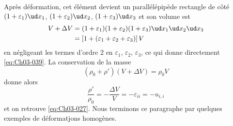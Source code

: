 Après déformation, cet élément devient un parallélépipède rectangle de côté $(1+\varepsilon_1)\ud x_1$, $(1+\varepsilon_2)\ud x_2$, $(1+\varepsilon_3)\ud x_3$ et son volume est
\begin{align*}
    V+\Delta V &= (1+\varepsilon_1)(1+\varepsilon_2)(1+\varepsilon_3)\ud x_1 \ud x_2 \ud x_3 \\
    &= \left[ 1 + \left( \varepsilon_1 + \varepsilon_2 + \varepsilon_3 \right) \right] V
\end{align*}
en négligeant les termes d'ordre 2 en $\varepsilon_1$, $\varepsilon_2$, $\varepsilon_3$, ce qui donne directement \eqref{eq:Ch03-039}.
La conservation de la masse
\begin{equation*}
    \left( \rho_0 + \rho' \right) \left( V + \Delta V \right) = \rho_0 V
\end{equation*}
donne alors
\begin{equation}
    \frac{\rho'}{\rho_0} = - \frac{\Delta V}{V} = - \varepsilon_{ii} = - u_{i,i}
    \label{eq:Ch03-040}
\end{equation}
et on retrouve \eqref{eq:Ch03-027}.
Nous terminons ce paragraphe par quelques exemples de déformatjons homogènes.

